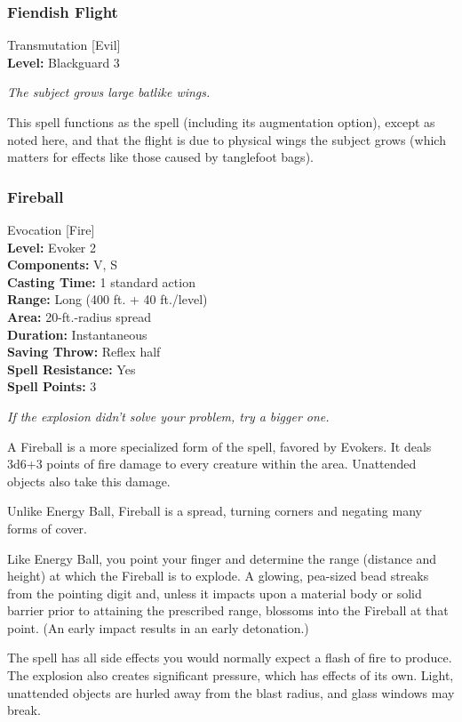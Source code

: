 \subsubsection{Fiendish Flight}
\label{Spell:FiendishFlight}
Transmutation [Evil]
\\ \textbf{Level:} Blackguard 3

\emph{The subject grows large batlike wings.}

This spell functions as the  spell (including its augmentation option), except as noted here, and that the flight is due to physical wings the subject grows (which matters for effects like those caused by tanglefoot bags).

\subsubsection{Fireball}
\label{Spell:Fireball}
Evocation [Fire]
\\ \textbf{Level:} Evoker 2
\\ \textbf{Components:} V, S
\\ \textbf{Casting Time:} 1 standard action
\\ \textbf{Range:} Long (400 ft. + 40 ft./level)
\\ \textbf{Area:} 20-ft.-radius spread
\\ \textbf{Duration:} Instantaneous
\\ \textbf{Saving Throw:} Reflex half
\\ \textbf{Spell Resistance:} Yes
\\ \textbf{Spell Points:} 3

\emph{If the explosion didn't solve your problem, try a bigger one.}

A Fireball is a more specialized form of the  spell, favored by Evokers. It deals 3d6+3 points of fire damage to every creature within the area. Unattended objects also take this damage. 

Unlike Energy Ball, Fireball is a spread, turning corners and negating many forms of cover.

Like Energy Ball, you point your finger and determine the range (distance and height) at which the Fireball is to explode. 
A glowing, pea-sized bead streaks from the pointing digit and, unless it impacts upon a material body or solid barrier prior to attaining the prescribed range, blossoms into the Fireball at that point. (An early impact results in an early detonation.)

The spell has all side effects you would normally expect a flash of fire to produce. The explosion also creates significant pressure, which has effects of its own. Light, unattended objects are hurled away from the blast radius, and glass windows may break.

